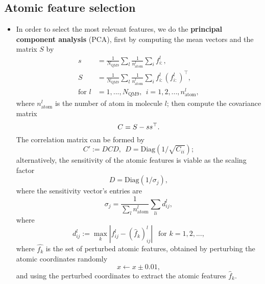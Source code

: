 \documentclass[12pt]{article}
\begin{document}
\subsection{Atomic feature selection}
\begin{itemize}
	\item In order to select the most relevant features, we do the \textbf{principal component analysis} (PCA), first by computing the mean vectors and the matrix $S$ by
	\begin{equation}
		\begin{split}
			s &= \frac{1}{N_\text{QM9}}\sum_{l} \frac{1}{n^l_\text{atom}}\sum_{i} f^l_{i:}, \\ 
			S &= \frac{1}{N_\text{QM9}}\sum_{l} \frac{1}{n^l_\text{atom}} \sum_{i} f^l_{i:} (f^l_{i:})^\top, \\ 
			\text{for } l &= 1,...,N_\text{QM9}, ~~ i = 1,2,...,n^l_\text{atom},
		\end{split}
	\end{equation}
	where $n^l_\text{atom}$ is the number of atom in molecule $l$; then compute the covariance matrix
	\begin{equation}
		\label{eq:pca_atom_start}
		C = S - ss^\top. \\			
	\end{equation}
	The correlation matrix can be formed by
	\begin{equation}
		C' := DCD, ~~ D = \text{Diag}(1/\sqrt{C_{ii}});
	\end{equation}
	alternatively, the sensitivity of the atomic features is viable as the scaling factor
	\begin{equation}
		D = \text{Diag}(1/\sigma_j),
	\end{equation}
	where the sensitivity vector's entries are
	\begin{equation}
		\sigma_j = \frac{1}{\sum_l n^l_\text{atom}}\sum_{li} d^l_{ij},
	\end{equation}
	where
	\begin{equation}
		d^l_{ij} := \max_k |f^l_{ij} - (\hat{f}_k)^l_{ij}|~~\text{ for }k = 1,2,...,
	\end{equation}
	where $\hat{f_k}$ is the set of perturbed atomic features, obtained by perturbing the atomic coordinates randomly
	\begin{equation}
		x \leftarrow x \pm 0.01,
	\end{equation}
	and using the perturbed coordinates to extract the atomic features $\hat{f}_k$.


\end{itemize}
\end{document}
